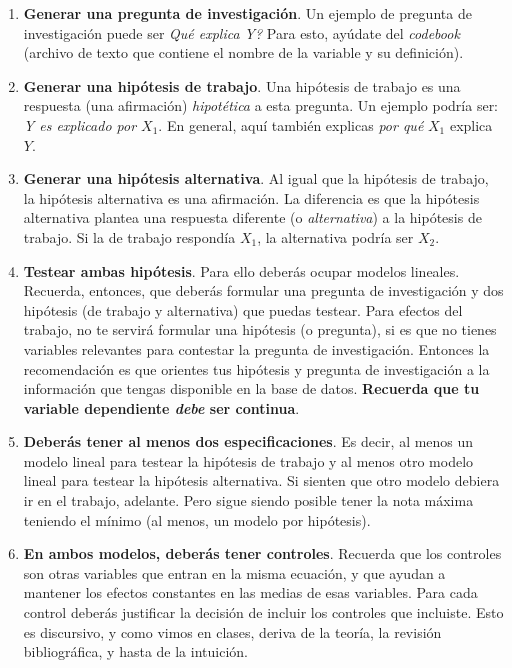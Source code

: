 \documentclass[10pt]{article}
\begin{document}
\begin{enumerate}
	\item {\bf Generar una pregunta de investigaci\'on}. Un ejemplo de pregunta de investigaci\'on puede ser \emph{Qu\'e explica Y?} Para esto, ay\'udate del \emph{codebook} (archivo de texto que contiene el nombre de la variable y su definici\'on).
	
	\item {\bf Generar una hip\'otesis de trabajo}. Una hip\'otesis de trabajo es una respuesta (una afirmaci\'on) \emph{hipot\'etica} a esta pregunta. Un ejemplo podr\'ia ser: \emph{Y es explicado por $X_{1}$}. En general, aqu\'i tambi\'en explicas \emph{por qu\'e} $X_{1}$ explica $Y$.
	
	\item  {\bf Generar una hip\'otesis alternativa}. Al igual que la hip\'otesis de trabajo, la hip\'otesis alternativa es una afirmaci\'on. La diferencia es que la hip\'otesis alternativa plantea una respuesta diferente (o \emph{alternativa}) a la hip\'otesis de trabajo. Si la de trabajo respond\'ia $X_{1}$, la alternativa podr\'ia ser $X_{2}$.
	
	\item {\bf Testear ambas hip\'otesis}. Para ello deber\'as ocupar modelos lineales. Recuerda, entonces, que deber\'as formular una pregunta de investigaci\'on y dos hip\'otesis (de trabajo y alternativa) que puedas testear. Para efectos del trabajo, no te servir\'a formular una hip\'otesis (o pregunta), si es que no tienes variables relevantes para contestar la pregunta de investigaci\'on. Entonces la recomendaci\'on es que orientes tus hip\'otesis y pregunta de investigaci\'on a la informaci\'on que tengas disponible en la base de datos. {\bf Recuerda que tu variable dependiente \emph{debe} ser continua}.

	\item {\bf Deber\'as tener al menos dos especificaciones}. Es decir, al menos un modelo lineal para testear la hip\'otesis de trabajo y al menos otro modelo lineal para testear la hip\'otesis alternativa. Si sienten que otro modelo debiera ir en el trabajo, adelante. Pero sigue siendo posible tener la nota m\'axima teniendo el m\'inimo (al menos, un modelo por hip\'otesis). %

	\item {\bf En ambos modelos, deber\'as tener controles}. Recuerda que los controles son otras variables que entran en la misma ecuaci\'on, y que ayudan a mantener los efectos constantes en las medias de esas variables. Para cada control deber\'as justificar la decisi\'on de incluir los controles que incluiste. Esto es discursivo, y como vimos en clases, deriva de la teor\'ia, la revisi\'on bibliogr\'afica, y hasta de la intuici\'on. 


\end{enumerate}
\end{document}
